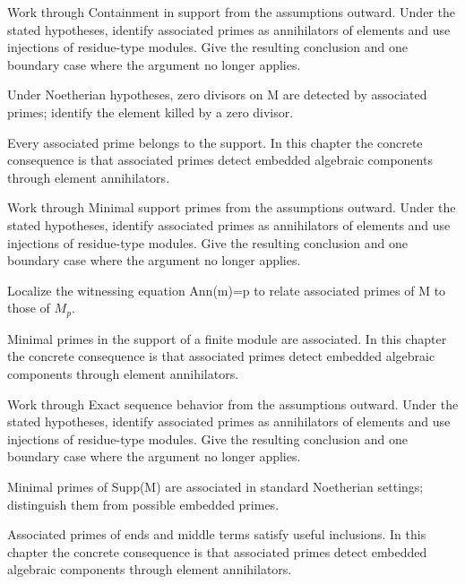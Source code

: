 \begin{exercise}\label{exr:v17-04}
Work through Containment in support from the assumptions outward. Under the stated hypotheses, identify associated primes as annihilators of elements and use injections of residue-type modules. Give the resulting conclusion and one boundary case where the argument no longer applies.
\end{exercise}
\begin{hint}
Under Noetherian hypotheses, zero divisors on M are detected by associated primes; identify the element killed by a zero divisor.
\end{hint}
\begin{solution}
Every associated prime belongs to the support. In this chapter the concrete consequence is that associated primes detect embedded algebraic components through element annihilators.
\end{solution}

\begin{exercise}\label{exr:v17-05}
Work through Minimal support primes from the assumptions outward. Under the stated hypotheses, identify associated primes as annihilators of elements and use injections of residue-type modules. Give the resulting conclusion and one boundary case where the argument no longer applies.
\end{exercise}
\begin{hint}
Localize the witnessing equation Ann(m)=p to relate associated primes of M to those of \(M_p\).
\end{hint}
\begin{solution}
Minimal primes in the support of a finite module are associated. In this chapter the concrete consequence is that associated primes detect embedded algebraic components through element annihilators.
\end{solution}

\begin{exercise}\label{exr:v17-06}
Work through Exact sequence behavior from the assumptions outward. Under the stated hypotheses, identify associated primes as annihilators of elements and use injections of residue-type modules. Give the resulting conclusion and one boundary case where the argument no longer applies.
\end{exercise}
\begin{hint}
Minimal primes of Supp(M) are associated in standard Noetherian settings; distinguish them from possible embedded primes.
\end{hint}
\begin{solution}
Associated primes of ends and middle terms satisfy useful inclusions. In this chapter the concrete consequence is that associated primes detect embedded algebraic components through element annihilators.
\end{solution}

